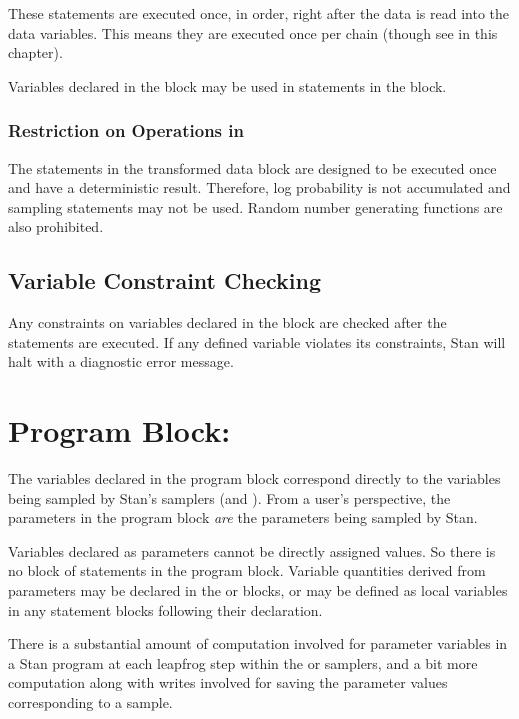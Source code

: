 These statements are executed once, in order, right after the data is
read into the data variables.  This means they are executed once per
chain (though see  in this chapter).

Variables declared in the  block may be used in statements
in the  block.

\subsubsection{Restriction on Operations in }

The statements in the transformed data block are designed to be
executed once and have a deterministic result.  Therefore, log
probability is not accumulated and sampling statements may not be
used.  Random number generating functions are also prohibited.

\subsection{Variable Constraint Checking}

Any constraints on variables declared in the 
block are checked after the statements are executed.  If any defined
variable violates its constraints, Stan will halt with a diagnostic
error message.


\section{Program Block: }

The variables declared in the  program block
correspond directly to the variables being sampled by Stan's samplers
(\HMC and \NUTS).  From a user's perspective, the parameters in the
program block \emph{are} the parameters being sampled by Stan.  

Variables declared as parameters cannot be directly assigned values.
So there is no block of statements in the  program
block.  Variable quantities derived from parameters may be declared in
the  or  blocks,
or may be defined as local variables in any statement blocks following
their declaration.

There is a substantial amount of computation involved for parameter
variables in a Stan program at each leapfrog step within the
\HMC or \NUTS samplers, and a bit more computation along with writes
involved for saving the parameter values corresponding to a sample.

